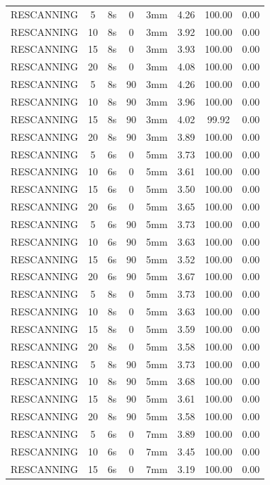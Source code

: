 \documentclass[type=dr, dr=rernat, accentcolor=tud7b,colorbacktitle, bigchapter, openright, twoside, 12pt ]{tudthesis}
\begin{document}
\begin{table}[H]
\begin{tabular}{|c|c||c|c|c||c|c|c|}
RESCANNING & 5 & 8s & 0 & 3mm & 4.26 & 100.00 & 0.00 \\
RESCANNING & 10 & 8s & 0 & 3mm & 3.92 & 100.00 & 0.00 \\
RESCANNING & 15 & 8s & 0 & 3mm & 3.93 & 100.00 & 0.00 \\
RESCANNING & 20 & 8s & 0 & 3mm & 4.08 & 100.00 & 0.00 \\
RESCANNING & 5 & 8s & 90 & 3mm & 4.26 & 100.00 & 0.00 \\
RESCANNING & 10 & 8s & 90 & 3mm & 3.96 & 100.00 & 0.00 \\
RESCANNING & 15 & 8s & 90 & 3mm & 4.02 & 99.92 & 0.00 \\
RESCANNING & 20 & 8s & 90 & 3mm & 3.89 & 100.00 & 0.00 \\
RESCANNING & 5 & 6s & 0 & 5mm & 3.73 & 100.00 & 0.00 \\
RESCANNING & 10 & 6s & 0 & 5mm & 3.61 & 100.00 & 0.00 \\
RESCANNING & 15 & 6s & 0 & 5mm & 3.50 & 100.00 & 0.00 \\
RESCANNING & 20 & 6s & 0 & 5mm & 3.65 & 100.00 & 0.00 \\
RESCANNING & 5 & 6s & 90 & 5mm & 3.73 & 100.00 & 0.00 \\
RESCANNING & 10 & 6s & 90 & 5mm & 3.63 & 100.00 & 0.00 \\
RESCANNING & 15 & 6s & 90 & 5mm & 3.52 & 100.00 & 0.00 \\
RESCANNING & 20 & 6s & 90 & 5mm & 3.67 & 100.00 & 0.00 \\
RESCANNING & 5 & 8s & 0 & 5mm & 3.73 & 100.00 & 0.00 \\
RESCANNING & 10 & 8s & 0 & 5mm & 3.63 & 100.00 & 0.00 \\
RESCANNING & 15 & 8s & 0 & 5mm & 3.59 & 100.00 & 0.00 \\
RESCANNING & 20 & 8s & 0 & 5mm & 3.58 & 100.00 & 0.00 \\
RESCANNING & 5 & 8s & 90 & 5mm & 3.73 & 100.00 & 0.00 \\
RESCANNING & 10 & 8s & 90 & 5mm & 3.68 & 100.00 & 0.00 \\
RESCANNING & 15 & 8s & 90 & 5mm & 3.61 & 100.00 & 0.00 \\
RESCANNING & 20 & 8s & 90 & 5mm & 3.58 & 100.00 & 0.00 \\
RESCANNING & 5 & 6s & 0 & 7mm & 3.89 & 100.00 & 0.00 \\
RESCANNING & 10 & 6s & 0 & 7mm & 3.45 & 100.00 & 0.00 \\
RESCANNING & 15 & 6s & 0 & 7mm & 3.19 & 100.00 & 0.00 \\

\end{tabular}
\end{table}
\end{document}
